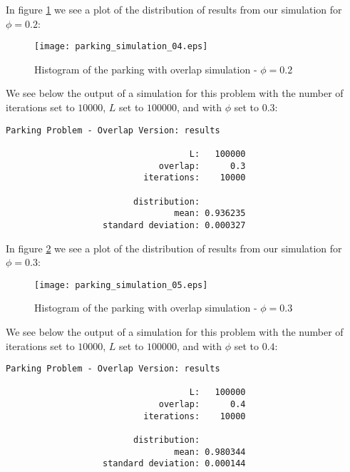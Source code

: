 In figure \ref{fig:ps4} we see a plot of the distribution 
of results from our simulation for $\phi = 0.2$: \bigskip

\begin{figure}[h!]
	\centering
	\texttt{[image: parking\_simulation\_04.eps]}
	\caption{Histogram of the parking with overlap simulation - $\phi = 0.2$}
	\label{fig:ps4}
\end{figure}\medskip

\newpage

We see below the output of a simulation for this 
problem with the number of iterations set to $10000$, 
$L$ set to $100000$, and with $\phi$ set to $0.3$: \bigskip

	\begin{lstlisting}[numbers=none]
    Parking Problem - Overlap Version: results

                                    L:   100000
                              overlap:      0.3
                           iterations:    10000

                         distribution:
                                 mean: 0.936235
                   standard deviation: 0.000327

	\end{lstlisting} \bigskip

In figure \ref{fig:ps5} we see a plot of the distribution 
of results from our simulation for $\phi = 0.3$: \bigskip

\begin{figure}[h!]
	\centering
	\texttt{[image: parking\_simulation\_05.eps]}
	\caption{Histogram of the parking with overlap simulation - $\phi = 0.3$}
	\label{fig:ps5}
\end{figure}\medskip

\newpage

We see below the output of a simulation for this 
problem with the number of iterations set to $10000$, 
$L$ set to $100000$, and with $\phi$ set to $0.4$: \bigskip

	\begin{lstlisting}[numbers=none]
    Parking Problem - Overlap Version: results

                                    L:   100000
                              overlap:      0.4
                           iterations:    10000

                         distribution:
                                 mean: 0.980344
                   standard deviation: 0.000144

	\end{lstlisting} \bigskip

